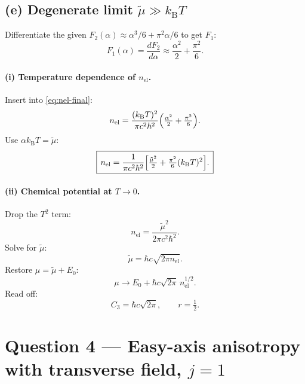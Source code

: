 \documentclass[11pt]{article}
\begin{document}
\subsection*{(e) Degenerate limit $\tilde\mu\gg k_{\mathrm B}T$}

Differentiate the given $F_2(\alpha)\approx\alpha^3/6+\pi^2\alpha/6$ to get $F_1$:
\begin{equation}
F_1(\alpha)=\frac{dF_2}{d\alpha}\approx\frac{\alpha^{2}}{2}+\frac{\pi^{2}}{6}.
\end{equation}

\paragraph{(i) Temperature dependence of $n_{\mathrm{el}}$.} Insert into \eqref{eq:nel-final}:
\begin{equation}
n_{\mathrm{el}}=\frac{(k_{\mathrm B}T)^{2}}{\pi c^{2}\hbar^{2}}\Bigl(\tfrac{\alpha^{2}}{2}+\tfrac{\pi^{2}}{6}\Bigr).
\end{equation}
Use $\alpha k_{\mathrm B}T=\tilde\mu$:
\begin{equation}
\boxed{\,n_{\mathrm{el}}=\frac{1}{\pi c^{2}\hbar^{2}}\Bigl[\tfrac{\tilde\mu^{2}}{2}+\tfrac{\pi^{2}}{6}(k_{\mathrm B}T)^{2}\Bigr].\,}
\label{eq:nel-degen}
\end{equation}

\paragraph{(ii) Chemical potential at $T\to 0$.} Drop the $T^2$ term:
\begin{equation}
n_{\mathrm{el}}=\frac{\tilde\mu^{2}}{2\pi c^{2}\hbar^{2}}.
\end{equation}
Solve for $\tilde\mu$:
\begin{equation}
\tilde\mu=\hbar c\sqrt{2\pi n_{\mathrm{el}}}.
\end{equation}
Restore $\mu=\tilde\mu+E_0$:
\begin{equation}
\mu\to E_{0}+\hbar c\sqrt{2\pi}\,n_{\mathrm{el}}^{1/2}.
\label{eq:mu-final}
\end{equation}
Read off:
\begin{equation}
\boxed{\,C_{3}=\hbar c\sqrt{2\pi},\qquad r=\tfrac{1}{2}.\,}
\label{eq:C3r}
\end{equation}

\section*{Question 4 --- Easy-axis anisotropy with transverse field, $j=1$}
\end{document}
